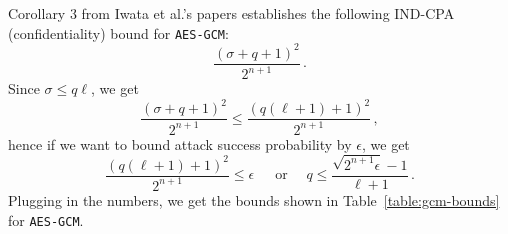 \documentclass{article}
\begin{document}
Corollary 3 from Iwata et al.'s papers establishes the following IND-CPA (confidentiality) bound for \texttt{AES-GCM}:
\begin{equation}
  \frac{(\sigma+q+1)^2}{2^{n+1}}\,.
\end{equation}
Since $\sigma\le q\ell$, we get
\begin{equation}
  \frac{(\sigma+q+1)^2}{2^{n+1}} \le \frac{(q(\ell+1)+1)^2}{2^{n+1}}\,,
\end{equation}
hence if we want to bound attack success probability by $\epsilon$, we get
\begin{equation}\label{eq:querybound}
  \frac{(q(\ell+1)+1)^2}{2^{n+1}} \le \epsilon\,\quad\text{ or }\quad q \le \frac{\sqrt{2^{n+1}\epsilon}-1}{\ell+1}\,.
\end{equation}
Plugging in the numbers, we get the bounds shown in Table~\ref{table:gcm-bounds} for \texttt{AES-GCM}.



\end{document}
